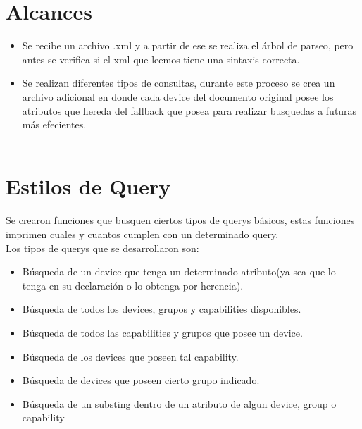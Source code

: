\documentclass[11pt]{article} %
\begin{document}
\section{\fontsize{14}{0} \bf Alcances}
\begin{itemize}
\item Se recibe un archivo .xml y a partir de ese se realiza el árbol de parseo, pero antes se verifica si el xml que leemos tiene una sintaxis correcta.\\
\item Se realizan  diferentes tipos de consultas, durante este proceso se crea un archivo adicional en donde cada device del documento original posee los atributos que hereda del fallback que posea para realizar busquedas a futuras más efecientes.\\\\
\end{itemize}

\newpage
\section{\fontsize{14}{0} \bf Estilos de Query}
 Se crearon funciones que busquen ciertos tipos de querys básicos, estas funciones imprimen cuales y cuantos cumplen con un determinado query.\\
Los tipos de querys que se desarrollaron son:
\begin{itemize}
 \item Búsqueda de un device que tenga un determinado atributo(ya sea que lo tenga en su declaración o lo obtenga por herencia).\\
 \item Búsqueda de todos los devices, grupos y capabilities disponibles.\\
\item Búsqueda de todos las capabilities y grupos que posee un device.\\
\item Búsqueda de los devices que poseen tal capability.\\
\item Búsqueda de devices que poseen cierto grupo indicado.\\
\item Búsqueda de un substing dentro de un atributo de algun device, group o capability

\end{itemize}

\newpage
\end{document}
